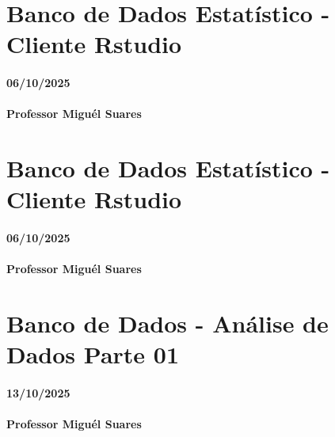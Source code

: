 \documentclass[
]{book}
\begin{document}
\chapter{Banco de Dados Estatístico - Cliente Rstudio}\label{banco-de-dados-estatuxedstico---cliente-rstudio}

\subsubsection*{06/10/2025}\label{section-13}

\subsubsection*{Professor Miguél Suares}\label{professor-miguuxe9l-suares-13}

\chapter{Banco de Dados Estatístico - Cliente Rstudio}\label{banco-de-dados-estatuxedstico---cliente-rstudio-1}

\subsubsection*{06/10/2025}\label{section-14}

\subsubsection*{Professor Miguél Suares}\label{professor-miguuxe9l-suares-14}

\chapter{Banco de Dados - Análise de Dados Parte 01}\label{banco-de-dados---anuxe1lise-de-dados-parte-01}

\subsubsection*{13/10/2025}\label{section-15}

\subsubsection*{Professor Miguél Suares}\label{professor-miguuxe9l-suares-15}
\end{document}
